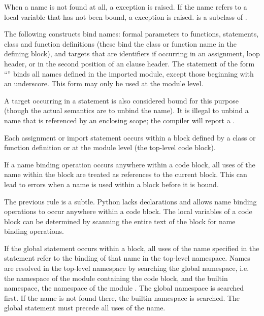 When a name is not found at all, a
 exception is raised.  If the name
refers to a local variable that has not been bound, a
 exception is
raised.   is a subclass of
.

The following constructs bind names: formal parameters to functions,
 statements, class and function definitions (these
bind the class or function name in the defining block), and targets
that are identifiers if occurring in an assignment,  loop
header, or in the second position of an  clause
header.  The  statement of the form ``'' binds all names defined in the
imported module, except those beginning with an underscore.  This form
may only be used at the module level.

A target occurring in a  statement is also considered bound
for this purpose (though the actual semantics are to unbind the
name).  It is illegal to unbind a name that is referenced by an
enclosing scope; the compiler will report a .

Each assignment or import statement occurs within a block defined by a
class or function definition or at the module level (the top-level
code block).

If a name binding operation occurs anywhere within a code block, all
uses of the name within the block are treated as references to the
current block.  This can lead to errors when a name is used within a
block before it is bound.

The previous rule is a subtle.  Python lacks declarations and allows
name binding operations to occur anywhere within a code block.  The
local variables of a code block can be determined by scanning the
entire text of the block for name binding operations.

If the global statement occurs within a block, all uses of the name
specified in the statement refer to the binding of that name in the
top-level namespace.  Names are resolved in the top-level namespace by
searching the global namespace, i.e. the namespace of the module
containing the code block, and the builtin namespace, the namespace of
the module .  The global namespace is searched
first.  If the name is not found there, the builtin namespace is
searched.  The global statement must precede all uses of the name.

